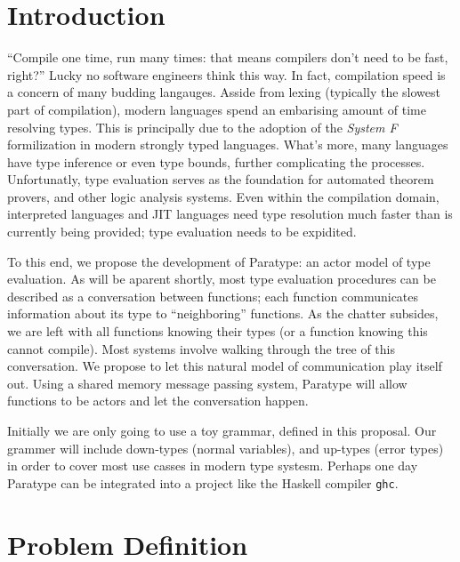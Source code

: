 \documentclass{acm_proc_article-sp}
\begin{document}


\section{Introduction}


``Compile one time, run many times: that means compilers don't need to
be fast, right?'' Lucky no software engineers think this way. In fact,
compilation speed is a concern of many budding langauges. Asside from
lexing (typically the slowest part of compilation)\cite{bright:blog},
modern languages spend an embarising amount of time resolving
types\cite{junaidu:phd}. This is principally due to the adoption of
the \emph{System F} formilization in modern strongly typed
languages. What's more, many languages have type inference or even
type bounds, further complicating the processes. Unfortunatly, 
type evaluation serves as the foundation for automated theorem
provers, and other logic analysis systems. Even within the compilation
domain, interpreted languages and JIT languages need type resolution
much faster than is currently being provided; type evaluation needs to
be expidited.

To this end, we propose the development of Paratype: an actor model of
type evaluation. As will be aparent shortly, most type evaluation
procedures can be described as a conversation between functions; each
function communicates information about its type to ``neighboring''
functions. As the chatter subsides, we are left with all functions
knowing their types (or a function knowing this cannot compile). Most
systems involve walking through the tree of this conversation. We
propose to let this natural model of communication play itself
out. Using a shared memory message passing system, Paratype will allow
functions to be actors and let the conversation happen.

Initially we are only going to use a toy grammar, defined in this
proposal. Our grammer will include down-types (normal variables), and
up-types (error types) in order to cover most use casses in modern
type systesm. Perhaps one day Paratype can be integrated into a
project like the Haskell compiler \texttt{ghc}.


\section{Problem Definition}
\label{sec:problem}
\end{document}
